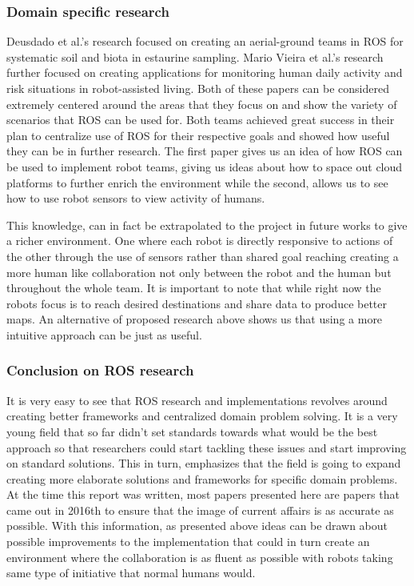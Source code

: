 \documentclass{report}
\begin{document}
      \subsubsection{Domain specific research}
        Deusdado et al.'s\cite{Pedro} research focused on creating an aerial-ground teams in ROS for systematic soil and biota in estaurine sampling. Mario Vieira et al.'s research further focused on creating applications for monitoring human daily activity and risk situations in robot-assisted living. Both of these papers can be considered extremely centered around the areas that they focus on and show the variety of scenarios that ROS can be used for. Both teams achieved great success in their plan to centralize use of ROS for their respective goals and showed how useful they can be in further research. The first paper gives us an idea of how ROS can be used to implement robot teams, giving us ideas about how to space out cloud platforms to further enrich the environment while the second, allows us to see how to use robot sensors to view activity of humans. 

        This knowledge, can in fact be extrapolated to the project in future works to give a richer environment. One where each robot is directly responsive to actions of the other through the use of sensors rather than shared goal reaching creating a more human like collaboration not only between the robot and the human but throughout the whole team. It is important to note that while right now the robots focus is to reach desired destinations and share data to produce better maps. An alternative of proposed research above shows us that using a more intuitive approach can be just as useful.

      \subsubsection{Conclusion on ROS research}
        It is very easy to see that ROS research and implementations revolves around creating better frameworks and centralized domain problem solving. It is a very young field that so far didn't set standards towards what would be the best approach so that researchers could start tackling these issues and start improving on standard solutions. This in turn, emphasizes that the field is going to expand creating more elaborate solutions and frameworks for specific domain problems. At the time this report was written, most papers presented here are papers that came out in 2016th to ensure that the image of current affairs is as accurate as possible. With this information, as presented above ideas can be drawn about possible improvements to the implementation that could in turn create an environment where the collaboration is as fluent as possible with robots taking same type of initiative that normal humans would.
\end{document}

